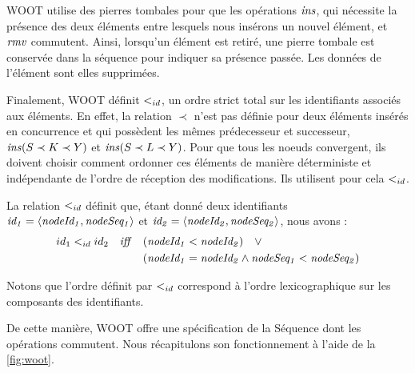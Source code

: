 WOOT utilise des pierres tombales pour que les opérations $\mathit{ins}$, qui nécessite la présence des deux éléments entre lesquels nous insérons un nouvel élément, et $\mathit{rmv}$ commutent.
Ainsi, lorsqu'un élément est retiré, une pierre tombale est conservée dans la séquence pour indiquer sa présence passée.
Les données de l'élément sont elles supprimées.

Finalement, WOOT définit $<_{id}$, un ordre strict total sur les identifiants associés aux éléments.
En effet, la relation $\prec$ n'est pas définie pour deux éléments insérés en concurrence et qui possèdent les mêmes prédecesseur et successeur, \eg $\mathit{ins}(S \prec K \prec Y)$ et $\mathit{ins}(S \prec L \prec Y)$.
Pour que tous les noeuds convergent, ils doivent choisir comment ordonner ces éléments de manière déterministe et indépendante de l'ordre de réception des modifications.
Ils utilisent pour cela $<_{id}$.
\begin{definition}
  La relation $<_{id}$ définit que, étant donné deux identifiants $\mathit{id_1} = \langle \mathit{nodeId_1},\mathit{nodeSeq_1} \rangle$ et $\mathit{id_2} = \langle \mathit{nodeId_2},\mathit{nodeSeq_2} \rangle$, nous avons :
  \begin{equation*}
    \begin{split}
      id_1 <_{id} id_2 \quad \mathit{iff} \quad  & (\mathit{nodeId_1} < \mathit{nodeId_2}) \quad \lor \\
                                            & (\mathit{nodeId_1} = \mathit{nodeId_2} \land \mathit{nodeSeq_1} < \mathit{nodeSeq_2}) \\
    \end{split}
  \end{equation*}
\end{definition}
Notons que l'ordre définit par $<_{id}$ correspond à l'ordre lexicographique sur les composants des identifiants.

De cette manière, WOOT offre une spécification de la Séquence dont les opérations commutent.
Nous récapitulons son fonctionnement à l'aide de la \autoref{fig:woot}.

